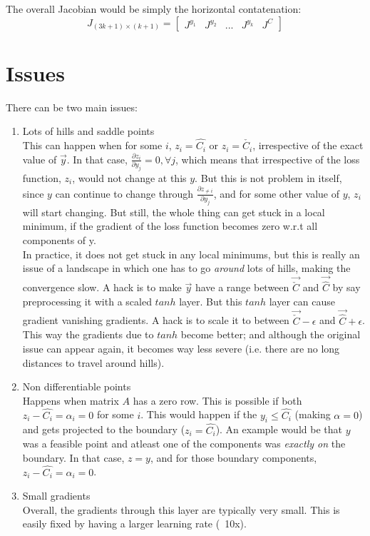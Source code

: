 \documentclass[11 pt]{article}
\begin{document}
The overall Jacobian would be simply the horizontal contatenation:
\begin{equation}
    J_{(3k+1)\times (k+1)} = \begin{bmatrix}J^{y_1}&J^{y_2}&...&J^{y_k}&J^C\end{bmatrix}
\end{equation}


\section{Issues}

There can be two main issues:
\begin{enumerate}
    \item Lots of hills and saddle points \\
            This can happen when for some $i$, $z_i = \hat{C_i}$ or $z_i = \check{C_i}$, irrespective of the exact value of $\vec{y}$. In that case, $\frac{\partial z_i}{\partial y_j} = 0, \forall j$, which means that irrespective of the loss function, $z_i$, would not change at this $y$. But this is not problem in itself, since $y$ can continue to change through $\frac{\partial z_{\ne i}}{\partial y_j}$, and for some other value of $y$, $z_i$ will start changing. But still, the whole thing can get stuck in a local minimum, if the gradient of the loss function becomes zero w.r.t all components of y. \\
            In practice, it does not get stuck in any local minimums, but this is really an issue of a landscape in which one has to go \textit{around} lots of hills, making the convergence slow. A hack is to make $\vec{y}$ have a range between $\vec{\check{C}}$ and $\vec{\hat{C}}$ by say preprocessing it with a scaled $tanh$ layer. But this $tanh$ layer can cause gradient vanishing gradients. A hack is to scale it to between $\vec{\check{C}} - \epsilon$ and $\vec{\hat{C}} + \epsilon$. This way the gradients due to $tanh$ become better; and although the original issue can appear again, it becomes way less severe (i.e. there are no long distances to travel around hills).
    \item Non differentiable points \\
            Happens when matrix $A$ has a zero row. This is possible if both $z_i - \hat{C_i} = \alpha_i = 0$ for some $i$. This would happen if the $y_i \le \hat{C_i}$ (making $\alpha=0$) and gets projected to the boundary ($z_i = \hat{C_i}$). An example would be that $y$ was a feasible point and atleast one of the components was \textit{exactly on} the boundary. In that case, $z=y$, and for those boundary components, $z_i - \hat{C_i} = \alpha_i = 0$.
    \item Small gradients \\
            Overall, the gradients through this layer are typically very small. This is easily fixed by having a larger learning rate (~10x).
\end{enumerate}
\end{document}
